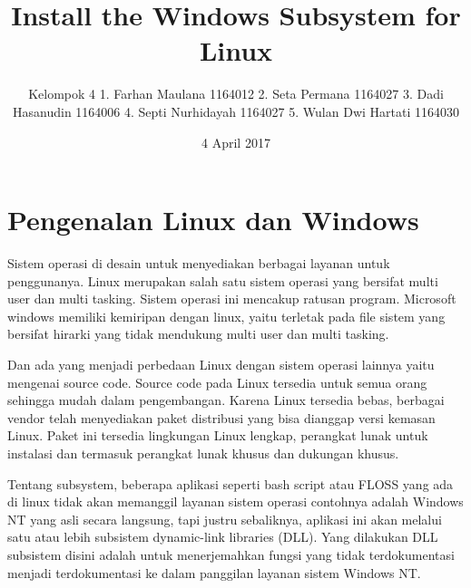 \documentclass{Install the Windows Subsystem for Linux}
\title{Install the Windows Subsystem for Linux \LaTex}
\author{Kelompok 4
1. Farhan Maulana       1164012
2. Seta Permana         1164027
3. Dadi Hasanudin       1164006
4. Septi Nurhidayah     1164027
5. Wulan Dwi Hartati    1164030}
\date{4 April 2017}
\begin{document}
\maketitle
\section{Pengenalan Linux dan Windows}
Sistem operasi di desain untuk menyediakan berbagai layanan untuk penggunanya. Linux merupakan salah satu sistem operasi yang bersifat multi user dan multi tasking. Sistem operasi ini mencakup ratusan program. Microsoft windows memiliki kemiripan dengan linux, yaitu terletak pada file sistem yang bersifat hirarki yang tidak mendukung multi user dan multi tasking.

Dan ada yang menjadi perbedaan Linux dengan sistem operasi lainnya yaitu mengenai source code. Source code pada Linux tersedia untuk semua orang sehingga mudah dalam pengembangan. Karena Linux tersedia bebas, berbagai vendor telah menyediakan paket distribusi yang bisa dianggap versi kemasan Linux. Paket ini tersedia lingkungan Linux lengkap, perangkat lunak untuk instalasi dan termasuk perangkat lunak khusus dan dukungan khusus.

Tentang subsystem, beberapa aplikasi  seperti bash script atau FLOSS yang ada di linux tidak akan memanggil layanan sistem operasi contohnya adalah Windows NT yang asli secara langsung, tapi justru sebaliknya, aplikasi ini akan melalui satu atau lebih subsistem dynamic-link libraries (DLL). Yang dilakukan DLL subsistem disini adalah untuk menerjemahkan fungsi yang tidak terdokumentasi menjadi terdokumentasi ke dalam panggilan layanan sistem Windows NT.
\end{document}
